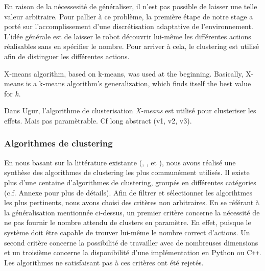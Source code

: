 \documentclass{llncs}
\begin{document}
En raison de la nécessesité de généraliser, il n'est pas possible de laisser une telle valeur arbitraire. Pour pallier à ce problème, la première étape de notre stage a porté sur l'accomplissement d'une discrétisation adaptative de l'environnement. L'idée générale est de laisser le robot découvrir lui-même les différentes actions réalisables sans en spécifier le nombre. Pour arriver à cela, le clustering est utilisé afin de distinguer les différentes actions. 

X-means algorithm\cite{Pelleg:2000:XEK:645529.657808}, based on k-means, was used at the beginning. Basically, X-means is a k-means algorithm's generalization, which finds itself the best value for $k$.




Dans Ugur, l'algorithme de clusterisation \textit{X-means} est utilisé pour clusteriser les effets. Mais pas paramètrable. Cf long abstract (v1, v2, v3).

%



\subsubsection{Algorithmes de clustering}

En nous basant sur la littérature existante (\cite{Xu2015}, \cite{Andreopoulos2009}, \cite{Fahad2014} et \cite{Sajana2016}), nous avons réalisé une synthèse des algorithmes de clustering les plus communément utilisés. Il existe plus d'une centaine d'algorithmes de clustering, groupés en différentes catégories (c.f. Annexe pour plus de détails). Afin de filtrer et sélectionner les algorihtmes les plus pertinents, nous avons choisi des critères non arbitraires. En se référant à la généralisation mentionnée ci-dessus, un premier critère concerne la nécessité de ne pas fournir le nombre attendu de clusters en paramètre. En effet, puisque le système doit être capable de trouver lui-même le nombre correct d'actions. Un second critère concerne la possibilité de travailler avec de nombreuses dimensions et un troisième concerne la disponibilité d'une implémentation en Python ou C{}\verb!++!. Les algorithmes ne satisfaisant pas à ces critères ont été rejetés.
\end{document}
